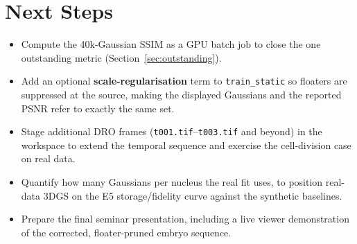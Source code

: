 \documentclass[11pt,a4paper]{article}
\newcommand{\code}[1]{\texttt{#1}}
\begin{document}
\section{Next Steps}
\label{sec:nextsteps}
\begin{itemize}
    \item Compute the 40k-Gaussian SSIM as a GPU batch job to close the one outstanding
    metric (Section~\ref{sec:outstanding}).
    \item Add an optional \textbf{scale-regularisation} term to \code{train\_static} so
    floaters are suppressed at the source, making the displayed Gaussians and the reported
    PSNR refer to exactly the same set.
    \item Stage additional DRO frames (\code{t001.tif}--\code{t003.tif} and beyond) in the
    workspace to extend the temporal sequence and exercise the cell-division case on real
    data.
    \item Quantify how many Gaussians per nucleus the real fit uses, to position real-data
    3DGS on the E5 storage/fidelity curve against the synthetic baselines.
    \item Prepare the final seminar presentation, including a live viewer demonstration of
    the corrected, floater-pruned embryo sequence.
\end{itemize}
\end{document}
